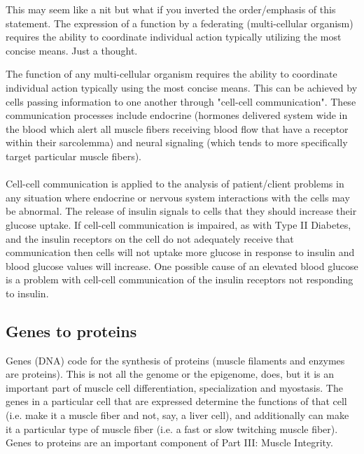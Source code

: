 This may seem like a nit but what if you inverted the order/emphasis of this statement. The expression of a function by a federating (multi-cellular organism) requires the ability to coordinate individual action typically utilizing the most concise means. Just a thought.

The function of any multi-cellular organism requires the ability to coordinate individual action typically using the most concise means. This can be achieved by cells passing information to one another through "cell-cell communication". These communication processes include endocrine (hormones delivered system wide in the blood which alert all muscle fibers receiving blood flow that have a receptor within their sarcolemma) and neural signaling (which tends to more specifically target particular muscle fibers). 

\paragraph{}
Cell-cell communication is applied to the analysis of patient/client problems in any situation where endocrine or nervous system interactions with the cells may be abnormal. The release of insulin signals to cells that they should increase their glucose uptake. If cell-cell communication is impaired, as with Type II Diabetes, and the insulin receptors on the cell do not adequately receive that communication then cells will not uptake more glucose in response to insulin and blood glucose values will increase. One possible cause of an elevated blood glucose is a problem with cell-cell communication of the insulin receptors not responding to insulin. 

\subsection{Genes to proteins}
Genes (DNA) code for the synthesis of proteins (muscle filaments and enzymes are proteins). This is not all the genome\footnotemark{} or the epigenome\footnotemark{}, does, but it is an important part of muscle cell differentiation, specialization and myostasis. The genes in a particular cell that are expressed determine the functions of that cell (i.e. make it a muscle fiber and not, say, a liver cell), and additionally can make it a particular type of muscle fiber (i.e. a fast or slow twitching muscle fiber). Genes to proteins are an important component of Part III: Muscle Integrity.

